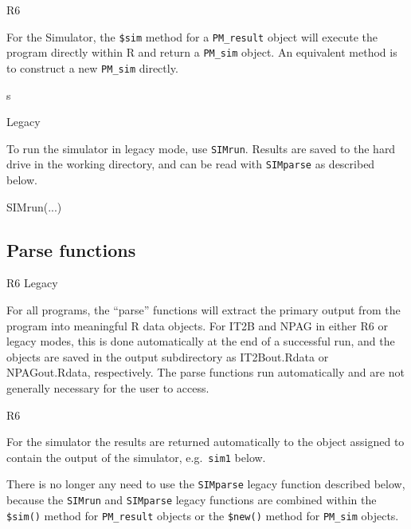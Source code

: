\documentclass[
]{book}
\newenvironment{Shaded}{\begin{snugshade}}{\end{snugshade}}
\newcommand{\FunctionTok}[1]{\textcolor[rgb]{0.00,0.00,0.00}{#1}}
\newcommand{\NormalTok}[1]{#1}
\newcommand{\OtherTok}[1]{\textcolor[rgb]{0.56,0.35,0.01}{#1}}
\newcommand{\SpecialCharTok}[1]{\textcolor[rgb]{0.00,0.00,0.00}{#1}}
\begin{document}
{R6}

For the Simulator, the \texttt{\$sim} method for a \texttt{PM\_result} object will execute the
program directly within R and return a \texttt{PM\_sim} object.
An equivalent method is to construct a new \texttt{PM\_sim} directly.

s

{Legacy}

To run the simulator in legacy mode, use \texttt{SIMrun}. Results are saved to the
hard drive in the working directory, and can be read with \texttt{SIMparse} as
described below.

\begin{Shaded}
\begin{Highlighting}[]
\FunctionTok{SIMrun}\NormalTok{(...)}
\end{Highlighting}
\end{Shaded}

\hypertarget{parse-functions}{%
\subsection{Parse functions}\label{parse-functions}}

{R6} {Legacy}

For all programs, the ``parse'' functions will extract the primary output
from the program into meaningful R data objects. For IT2B and NPAG in either R6
or legacy modes, this
is done automatically at the end of a successful run, and the objects
are saved in the output subdirectory as IT2Bout.Rdata or NPAGout.Rdata,
respectively. The parse functions run automatically and are not
generally necessary for the user to access.

{R6}

For the simulator the results are returned automatically to the object assigned
to contain the output of the simulator, e.g.~\texttt{sim1} below.

\begin{Shaded}
\end{Shaded}

There is no longer any
need to use the \texttt{SIMparse} legacy function described below, because the
\texttt{SIMrun} and \texttt{SIMparse} legacy functions are combined within the \texttt{\$sim()} method
for \texttt{PM\_result} objects or the \texttt{\$new()} method for \texttt{PM\_sim} objects.
\end{document}
